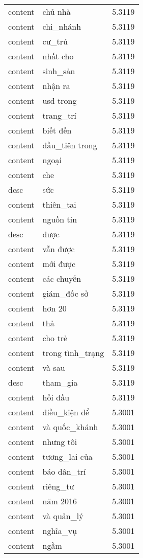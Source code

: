 \documentclass{article}
\begin{document}
\begin{tabular}{lll}
content & chủ nhà & 5.3119\\
content & chi\_nhánh & 5.3119\\
content & cư\_trú & 5.3119\\
content & nhất cho & 5.3119\\
content & sinh\_sản & 5.3119\\
content & nhận ra & 5.3119\\
content & usd trong & 5.3119\\
content & trang\_trí & 5.3119\\
content & biết đến & 5.3119\\
content & đầu\_tiên trong & 5.3119\\
content & ngoại & 5.3119\\
content & che & 5.3119\\
desc & sức & 5.3119\\
content & thiên\_tai & 5.3119\\
content & nguồn tin & 5.3119\\
desc & được & 5.3119\\
content & vẫn được & 5.3119\\
content & mới được & 5.3119\\
content & các chuyến & 5.3119\\
content & giám\_đốc sở & 5.3119\\
content & hơn 20 & 5.3119\\
content & thả & 5.3119\\
content & cho trẻ & 5.3119\\
content & trong tình\_trạng & 5.3119\\
content & và sau & 5.3119\\
desc & tham\_gia & 5.3119\\
content & hồi đầu & 5.3119\\
content & điều\_kiện để & 5.3001\\
content & và quốc\_khánh & 5.3001\\
content & nhưng tôi & 5.3001\\
content & tương\_lai của & 5.3001\\
content & báo dân\_trí & 5.3001\\
content & riêng\_tư & 5.3001\\
content & năm 2016 & 5.3001\\
content & và quản\_lý & 5.3001\\
content & nghĩa\_vụ & 5.3001\\
content & ngầm & 5.3001\\

\end{tabular}
\end{document}
